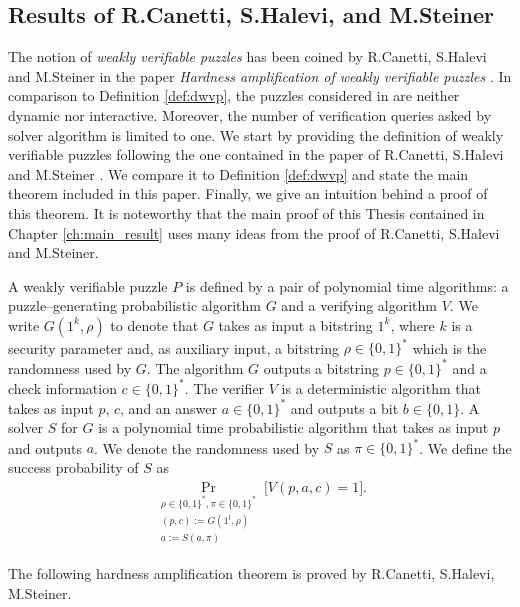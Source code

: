 \documentclass[11pt,a4paper,titlepage]{memoir}
\begin{document}
\subsection{Results of R.Canetti, S.Halevi, and M.Steiner}
The notion of \textit{weakly verifiable puzzles} has been coined by R.Canetti, S.Halevi and M.Steiner in the paper
\textit{Hardness amplification of weakly verifiable puzzles} \cite{canetti2004hardness}.
In comparison to Definition \ref{def:dwvp}, the puzzles considered in \cite{canetti2004hardness} are neither dynamic nor interactive.
Moreover, the number of verification queries asked by solver algorithm is limited to one.
We start by providing the definition of weakly verifiable puzzles following the one contained in the paper of R.Canetti, S.Halevi and M.Steiner \cite{canetti2004hardness}.
We compare it to Definition \ref{def:dwvp} and state the main theorem included in this paper. Finally, we give an intuition behind a proof of this theorem.
It is noteworthy that the main proof of this Thesis contained in Chapter \ref{ch:main_result} uses many ideas from the proof of R.Canetti, S.Halevi and M.Steiner.
%
\begin{definition}
  \label{def:wvp}
A \textnormal{weakly verifiable puzzle} $P$ is defined by a pair of polynomial time algorithms:
a puzzle--generating probabilistic algorithm $G$ and a verifying algorithm $V$.
We write $G(1^k, \rho)$ to denote that $G$ takes as input a bitstring $1^k$, where $k$ is a security parameter
and, as auxiliary input, a bitstring $\rho \in \{0,1\}^{*}$ which is the randomness used by $G$.
The algorithm $G$ outputs a bitstring $p \in \{0,1\}^{*}$ and a check information $c \in \{0,1\}^{*}$.
The \textnormal{verifier} $V$ is a deterministic algorithm that takes as input $p$, $c$, and an answer $a \in \{0,1\}^{*}$
and outputs a bit $b \in \{0,1\}$. A \textnormal{solver} $S$ for $G$ is a polynomial time probabilistic algorithm that
takes as input $p$ and outputs $a$. We denote the randomness used by $S$ as $\pi \in \{0,1\}^{*}$.
We define the \textnormal{success probability} of $S$ as
\begin{align*}
  \underset{\substack{\rho \in \{0,1\}^{*}, \pi \in \{0,1\}^{*} \\ (p,c):=G(1^l, \rho) \\ a := S(a,\pi)}}{\Pr}\Big[ V(p, a,c) = 1\Big].
\end{align*}
\end{definition}
%
The following hardness amplification theorem is proved by R.Canetti, S.Halevi, M.Steiner.
\end{document}
